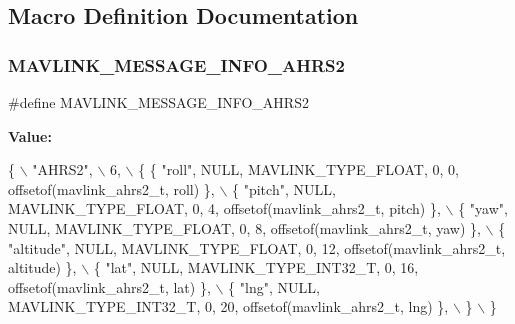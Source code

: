 \subsection{Macro Definition Documentation}
\mbox{\label{mavlink__msg__ahrs2_8h_a1c3245bf0c20784bce5f5c948599fac2}} 
\subsubsection{M\+A\+V\+L\+I\+N\+K\+\_\+\+M\+E\+S\+S\+A\+G\+E\+\_\+\+I\+N\+F\+O\+\_\+\+A\+H\+R\+S2}
{\footnotesize\ttfamily \#define M\+A\+V\+L\+I\+N\+K\+\_\+\+M\+E\+S\+S\+A\+G\+E\+\_\+\+I\+N\+F\+O\+\_\+\+A\+H\+R\+S2}

{\bfseries Value\+:}
\begin{DoxyCode}
\{ \(\backslash\)
    \textcolor{stringliteral}{"AHRS2"}, \(\backslash\)
    6, \(\backslash\)
    \{  \{ \textcolor{stringliteral}{"roll"}, NULL, MAVLINK_TYPE_FLOAT, 0, 0, offsetof(mavlink_ahrs2_t, roll) \}, \(\backslash\)
         \{ \textcolor{stringliteral}{"pitch"}, NULL, MAVLINK_TYPE_FLOAT, 0, 4, offsetof(mavlink_ahrs2_t, pitch) \}, \(\backslash\)
         \{ \textcolor{stringliteral}{"yaw"}, NULL, MAVLINK_TYPE_FLOAT, 0, 8, offsetof(mavlink_ahrs2_t, yaw) \}, \(\backslash\)
         \{ \textcolor{stringliteral}{"altitude"}, NULL, MAVLINK_TYPE_FLOAT, 0, 12, offsetof(mavlink_ahrs2_t, altitude) \}, \(\backslash\)
         \{ \textcolor{stringliteral}{"lat"}, NULL, MAVLINK_TYPE_INT32_T, 0, 16, offsetof(mavlink_ahrs2_t, lat) \}, \(\backslash\)
         \{ \textcolor{stringliteral}{"lng"}, NULL, MAVLINK_TYPE_INT32_T, 0, 20, offsetof(mavlink_ahrs2_t, lng) \}, \(\backslash\)
         \} \(\backslash\)
\}
\end{DoxyCode}
\mbox{\label{mavlink__msg__ahrs2_8h_a0d679a72a6afe6cf62192b89b935801a}} 
